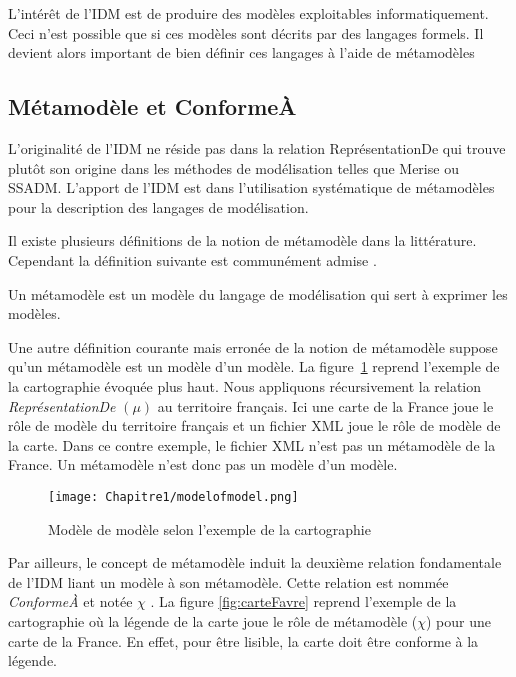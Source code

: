 L'intérêt de l'IDM est de produire des modèles exploitables informatiquement. Ceci n'est possible que si ces modèles sont décrits par des langages formels. Il devient alors important de bien définir ces langages à l'aide de métamodèles

\subsection{Métamodèle et ConformeÀ }
L'originalité de l'IDM ne réside pas dans la relation ReprésentationDe qui trouve plutôt son origine dans les méthodes de modélisation telles que Merise ou SSADM. L'apport de l'IDM est dans l'utilisation systématique de métamodèles pour la description des langages de modélisation. 

Il existe plusieurs définitions de la notion de métamodèle dans la littérature. Cependant la définition suivante est communément admise \cite{bezivin2004rapport}.

\begin{theorem}
Un métamodèle est un modèle du langage de modélisation qui sert à exprimer les modèles.
\end{theorem}
Une autre définition courante mais erronée de la notion de métamodèle suppose qu'un métamodèle est un modèle d'un modèle. La figure~\ref{fig:modelofmodel} reprend l'exemple de la cartographie évoquée plus haut. Nous appliquons récursivement la relation \textit{ReprésentationDe} $(\mu)$ au territoire français. Ici une carte de la France joue le rôle de modèle du territoire français et un fichier XML joue le rôle de modèle de la carte. Dans ce contre exemple, le fichier XML n'est pas un métamodèle de la France. Un métamodèle n'est donc pas un modèle d'un modèle.

\begin{figure}[!htbp]
 \begin{center}
  \texttt{[image: Chapitre1/modelofmodel.png]}
 \end{center}
 \caption{Modèle de modèle selon l'exemple de la cartographie \protect\cite{favre2006ingenierie}}
 \label{fig:modelofmodel}
\end{figure}

Par ailleurs, le concept de métamodèle induit la deuxième relation fondamentale de l'IDM liant un modèle à son métamodèle. Cette relation est nommée \textit{ConformeÀ} et notée $\chi$ \cite{bezivin2004search} \cite{favre2004towards}. La figure \ref{fig:carteFavre} reprend l'exemple de la cartographie où la légende de la carte joue le rôle de métamodèle ($\chi$) pour une carte de la France. En effet, pour être lisible, la carte doit être conforme à la légende.

